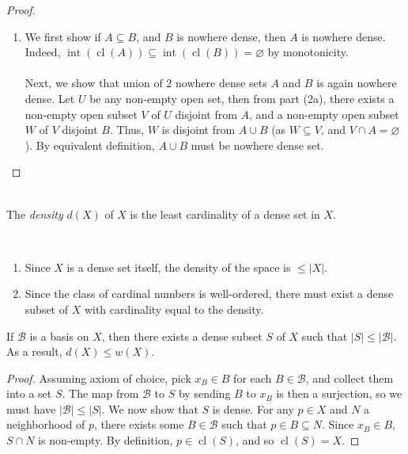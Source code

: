 \documentclass{treatise}
\begin{document}
\begin{proof}
\begin{enumerate}[label=(\alph*)]
    \item We first show if $A \subseteq B$, and $B$ is nowhere dense, then $A$ is nowhere dense. Indeed, $\operatorname{int}(\operatorname{cl}(A)) \subseteq \operatorname{int}(\operatorname{cl}(B)) = \varnothing$ by monotonicity.
    \\
    \\
    Next, we show that union of 2 nowhere dense sets $A$ and $B$ is again nowhere dense. Let $U$ be any non-empty open set, then from part (2a), there exists a non-empty open subset $V$ of $U$ disjoint from $A$, and a non-empty open subset $W$ of $V$ disjoint $B$. Thus, $W$ is disjoint from $A \cup B$ (as $W \subseteq V$, and $V \cap A = \varnothing$). By equivalent definition, $A \cup B$ must be nowhere dense set.
\end{enumerate}
\end{proof}
\ \\
The \emph{density} $d(X)$ of $X$ is the least cardinality of a dense set in $X$.
\begin{remark} \ 
\begin{enumerate}
    \item Since $X$ is a dense set itself, the density of the space is $\leq |X|$.
    \item Since the class of cardinal numbers is well-ordered, there must exist a dense subset of $X$ with cardinality equal to the density.
\end{enumerate}
\end{remark}
\begin{proposition}
If $\mathcal{B}$ is a basis on $X$, then there exists a dense subset $S$ of $X$ such that $|S| \leq |\mathcal{B}|$. As a result, $d(X) \leq w(X)$.
\end{proposition}
\begin{proof}
Assuming axiom of choice, pick $x_B \in B$ for each $B \in \mathcal{B}$, and collect them into a set $S$. The map from $\mathcal{B}$ to $S$ by sending $B$ to $x_B$ is then a surjection, so we must have $|\mathcal{B}| \leq |S|$. We now show that $S$ is dense. For any $p \in X$ and $N$ a neighborhood of $p$, there exists some $B \in \mathcal{B}$ such that $p \in B \subseteq N$. Since $x_B \in B$, $S \cap N$ is non-empty. By definition, $p \in \operatorname{cl}(S)$, and so $\operatorname{cl}(S) = X$.
\end{proof}
\end{document}
